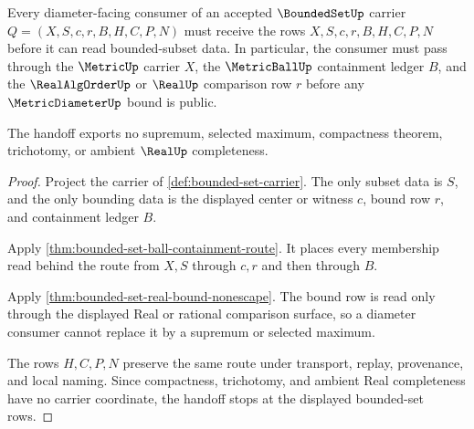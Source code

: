 \begin{theorem}
\label{thm:bounded-set-diameter-consumer-handoff}
Every diameter-facing consumer of an accepted $\BoundedSetUp$ carrier $Q=(X,S,c,r,B,H,C,P,N)$ must receive the rows $X,S,c,r,B,H,C,P,N$ before it can read bounded-subset data. In particular, the consumer must pass through the $\MetricUp$ carrier $X$, the $\MetricBallUp$ containment ledger $B$, and the $\RealAlgOrderUp$ or $\RealUp$ comparison row $r$ before any $\MetricDiameterUp$ bound is public.

The handoff exports no supremum, selected maximum, compactness theorem, trichotomy, or ambient $\RealUp$ completeness.
\end{theorem}
\begin{proof}
Project the carrier of \autoref{def:bounded-set-carrier}. The only subset data is $S$, and the only bounding data is the displayed center or witness $c$, bound row $r$, and containment ledger $B$.

Apply \autoref{thm:bounded-set-ball-containment-route}. It places every membership read behind the route from $X,S$ through $c,r$ and then through $B$.

Apply \autoref{thm:bounded-set-real-bound-nonescape}. The bound row is read only through the displayed Real or rational comparison surface, so a diameter consumer cannot replace it by a supremum or selected maximum.

The rows $H,C,P,N$ preserve the same route under transport, replay, provenance, and local naming. Since compactness, trichotomy, and ambient Real completeness have no carrier coordinate, the handoff stops at the displayed bounded-set rows.
\end{proof}

